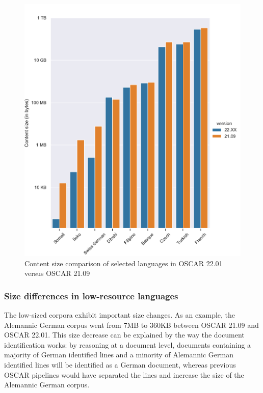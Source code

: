 \begin{figure}[!ht]
    \begin{center}
        \includegraphics[width=\linewidth]{static/media/data/towards/size_comp_content}
        \caption{Content size comparison of selected languages in OSCAR 22.01 versus OSCAR 21.09}
        \label{fig.2}
    \end{center}
\end{figure}

\subsubsection{Size differences in low-resource languages}

The low-sized corpora exhibit important size changes. As an example, the Alemannic German corpus went from 7MB to 360KB between OSCAR 21.09 and OSCAR 22.01. This size decrease can be explained by the way the document identification works: by reasoning at a document level, documents containing a majority of German identified lines and a minority of Alemannic German identified lines will be identified as a German document, whereas previous OSCAR pipelines would have separated the lines and increase the size of the Alemannic German corpus.

